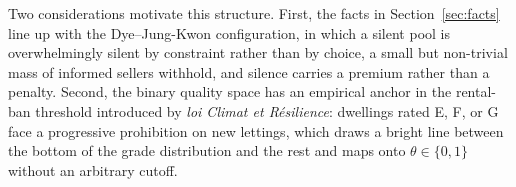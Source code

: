 Two considerations motivate this structure. First, the facts in
Section~\ref{sec:facts} line up with the Dye--Jung-Kwon configuration, in which a silent pool is
overwhelmingly silent by constraint rather than by choice, a small but non-trivial mass of
informed sellers withhold, and silence carries a premium rather than a penalty. Second, the binary quality space has an empirical anchor in the rental-ban
threshold introduced by \emph{loi Climat et R\'esilience}: dwellings rated E, F, or G face a
progressive prohibition on new lettings, which draws a bright line between the bottom of the
grade distribution and the rest and maps onto $\theta\in\{0,1\}$ without an arbitrary cutoff.
